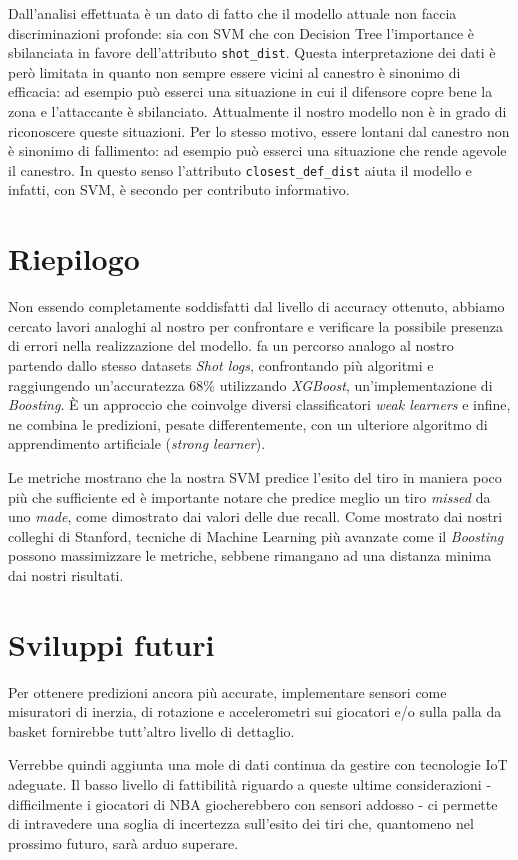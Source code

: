 Dall'analisi effettuata è un dato di fatto che il modello attuale non faccia discriminazioni profonde: sia con SVM che con Decision Tree l'importance è sbilanciata in favore dell'attributo \texttt{shot\_dist}. 
Questa interpretazione dei dati è però limitata in quanto non sempre essere vicini al canestro è sinonimo di efficacia: ad esempio può esserci una situazione in cui il difensore copre bene la zona e l'attaccante è sbilanciato. Attualmente il nostro modello non è in grado di riconoscere queste situazioni. Per lo stesso motivo, essere lontani dal canestro non è sinonimo di fallimento: ad esempio può esserci una situazione che rende agevole il canestro.
In questo senso l'attributo \texttt{closest\_def\_dist} aiuta il modello e infatti, con SVM, è secondo per contributo informativo.

\section{Riepilogo}

\par
Non essendo completamente soddisfatti dal livello di accuracy ottenuto, abbiamo cercato lavori analoghi al nostro per confrontare e verificare la possibile presenza di errori nella realizzazione del modello. \cite{predictingNBAst} fa un percorso analogo al nostro partendo dallo stesso datasets \textit{Shot logs}, confrontando più algoritmi e raggiungendo un'accuratezza  68\% utilizzando \textit{XGBoost}, un'implementazione di \textit{Boosting}. È un approccio che coinvolge diversi classificatori \textit{weak learners} e infine, ne combina le predizioni, pesate differentemente, con un ulteriore algoritmo di apprendimento artificiale (\textit{strong learner}).

Le metriche mostrano che la nostra SVM predice l'esito del tiro in maniera poco più che sufficiente ed è importante notare che predice meglio un tiro \textit{missed} da uno \textit{made}, come dimostrato dai valori delle due recall.
Come mostrato dai nostri colleghi di Stanford, tecniche di Machine Learning più avanzate come il \textit{Boosting} possono massimizzare le metriche, sebbene rimangano ad una distanza minima dai nostri risultati.

\section{Sviluppi futuri}
Per ottenere predizioni ancora più accurate, implementare sensori come misuratori di inerzia, di rotazione e accelerometri sui giocatori e/o sulla palla da basket fornirebbe tutt'altro livello di dettaglio.

Verrebbe quindi aggiunta una mole di dati continua da gestire con tecnologie IoT adeguate. Il basso livello di fattibilità riguardo a queste ultime considerazioni - difficilmente i giocatori di NBA giocherebbero con sensori addosso - ci permette di intravedere una soglia di incertezza sull'esito dei tiri che, quantomeno nel prossimo futuro, sarà arduo superare.